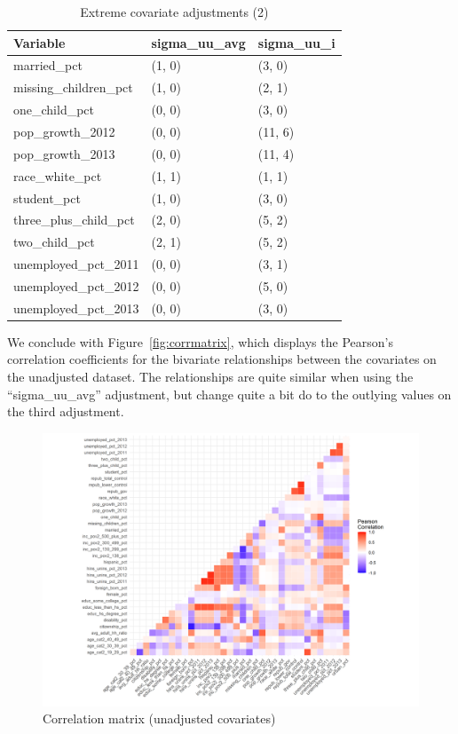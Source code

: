 \documentclass[12pt]{article}
\begin{document}
\begin{table}[ht]
\centering
\begin{tabular}{lll}
  \toprule
Variable & sigma\_uu\_avg & sigma\_uu\_i \\ 
  \midrule
  married\_pct & (1, 0) & (3, 0) \\ 
  missing\_children\_pct & (1, 0) & (2, 1) \\ 
  one\_child\_pct & (0, 0) & (3, 0) \\ 
  pop\_growth\_2012 & (0, 0) & (11, 6) \\ 
  pop\_growth\_2013 & (0, 0) & (11, 4) \\ 
  race\_white\_pct & (1, 1) & (1, 1) \\ 
  student\_pct & (1, 0) & (3, 0) \\ 
  three\_plus\_child\_pct & (2, 0) & (5, 2) \\ 
  two\_child\_pct & (2, 1) & (5, 2) \\ 
  unemployed\_pct\_2011 & (0, 0) & (3, 1) \\ 
  unemployed\_pct\_2012 & (0, 0) & (5, 0) \\ 
  unemployed\_pct\_2013 & (0, 0) & (3, 0) \\ 
   \bottomrule
\end{tabular}
    \caption{Extreme covariate adjustments (2)}
    \label{tab:extreme2}
\end{table}

We conclude with Figure~\ref{fig:corrmatrix}, which displays the Pearson's correlation coefficients for the bivariate relationships between the covariates on the unadjusted dataset. The relationships are quite similar when using the ``sigma\_uu\_avg'' adjustment, but change quite a bit do to the outlying values on the third adjustment.

\begin{figure}[]
\begin{center}
    \includegraphics[scale=0.8]{01_Plots/correlation-plot-c1-sigma-zero.png}
    \caption{Correlation matrix (unadjusted covariates)}
    \label{oatearea}
\end{center}
\end{figure}
\end{document}
